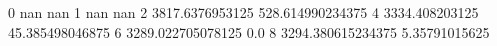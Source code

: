 0 nan nan
1 nan nan
2 3817.6376953125 528.614990234375
4 3334.408203125 45.385498046875
6 3289.022705078125 0.0
8 3294.380615234375 5.35791015625
